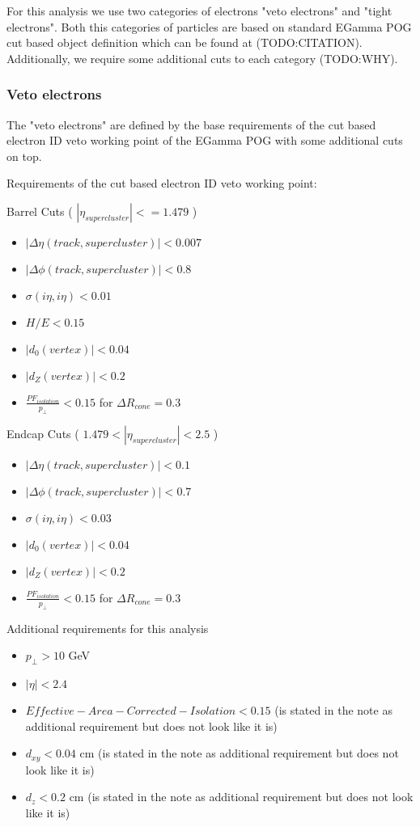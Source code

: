 For this analysis we use two categories of electrons "veto electrons" and "tight electrons". Both this categories of particles are based on standard EGamma POG cut based object definition which can be found at (TODO:CITATION). Additionally, we require some additional cuts to each category (TODO:WHY).

\subsubsection{Veto electrons}
 
The "veto electrons" are defined by the base requirements of the cut based electron ID veto working point of the EGamma POG with some additional cuts on top. 
 
Requirements of the cut based electron ID veto working point:

Barrel Cuts ( $ |\eta_{supercluster}|<=1.479 $ )
\begin{itemize}
  \item $ | \Delta\eta(track,supercluster) | < 0.007 $
  \item $ | \Delta\phi(track,supercluster) | < 0.8 $
  \item $ \sigma(i\eta,i\eta) < 0.01 $
  \item $ H/E < 0.15 $
  \item $ |d_{0}(vertex)| < 0.04 $
  \item $ |d_{Z}(vertex)| < 0.2 $
  \item $ \frac{PF_{isolation}}{p_{\perp}} < 0.15 $ for $ \Delta R_{cone}=0.3 $
\end{itemize}

Endcap Cuts ( $ 1.479 < |\eta_{supercluster}| < 2.5 $ )
\begin{itemize}
  \item $ | \Delta\eta(track,supercluster) | < 0.1 $
  \item $ | \Delta\phi(track,supercluster) | < 0.7 $
  \item $ \sigma(i\eta,i\eta) < 0.03 $
  \item $ |d_{0}(vertex)| < 0.04 $
  \item $ |d_{Z}(vertex)| < 0.2 $
  \item $ \frac{PF_{isolation}}{p_{\perp}} < 0.15 $ for $ \Delta R_{cone}=0.3 $
\end{itemize}

Additional requirements for this analysis
\begin{itemize}
  \item $ p_{\perp} > 10 $ GeV
  \item $ |\eta| < 2.4 $
  \item $ Effective-Area-Corrected-Isolation < 0.15 $ (is stated in the note as additional requirement but does not look like it is)
  \item $d_{xy}<0.04$ cm (is stated in the note as additional requirement but does not look like it is)
  \item $d_{z} < 0.2 $ cm (is stated in the note as additional requirement but does not look like it is)
\end{itemize}

